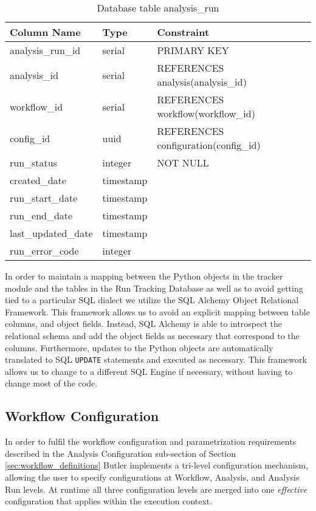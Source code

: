 \begin{table}[H]
\renewcommand{\arraystretch}{1.2} 
\centering
\begin{tabular}{@{}lll@{}}
\toprule
Column Name & Type & Constraint\\
\midrule
analysis\_run\_id & serial & PRIMARY KEY\\
analysis\_id & serial & REFERENCES analysis(analysis\_id)\\
workflow\_id & serial & REFERENCES workflow(workflow\_id)\\
config\_id & uuid & REFERENCES configuration(config\_id)\\
run\_status & integer & NOT NULL\\
created\_date & timestamp\\
run\_start\_date & timestamp\\
run\_end\_date & timestamp\\
last\_updated\_date & timestamp\\
run\_error\_code & integer\\
\bottomrule
\end{tabular}
\caption{Database table analysis\_run}
\end{table}

In order to maintain a mapping between the Python objects in the tracker module and the tables in the Run Tracking Database as well as to avoid getting tied to a particular SQL dialect we utilize the SQL Alchemy Object Relational Framework. This framework allows us to avoid an explicit mapping between table columns, and object fields. Instead, SQL Alchemy is able to introspect the relational schema and add the object fields as necessary that correspond to the columns. Furthermore, updates to the Python objects are automatically translated to SQL \texttt{UPDATE} statements and executed as necessary. This framework allows us to change to a different SQL Engine if necessary, without having to change most of the code.

\subsection{Workflow Configuration} 
\label{sec:workflow_configuration_design}

In order to fulfil the workflow configuration and parametrization requirements described in the Analysis Configuration sub-section of Section \ref{sec:workflow_definitions} Butler implements a tri-level configuration mechanism, allowing the user to specify configurations at Workflow, Analysis, and Analysis Run levels. At runtime all three configuration levels are merged into one \emph{effective} configuration that applies within the execution context.

